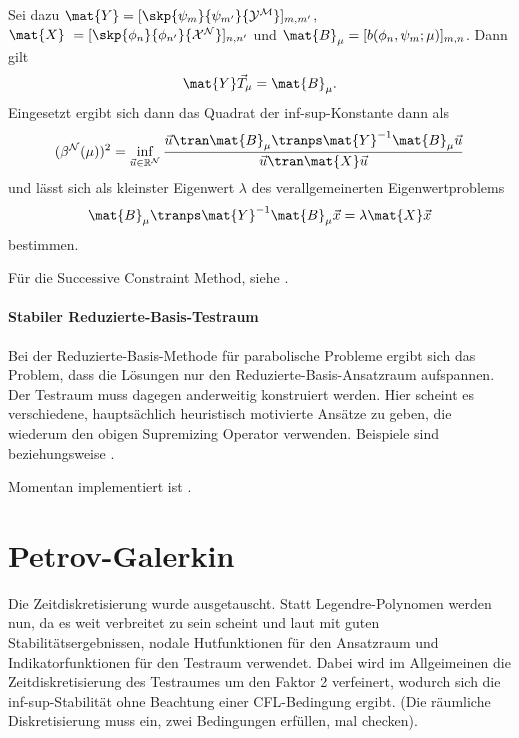Sei dazu $\mat{Y} = [\skp{\psi_{m}}{\psi_{m'}}{\mathcal Y^{\mathcal M}}]_{m, m'}$, $\mat{X} = [\skp{\phi_{n}}{\phi_{n'}}{\mathcal X^{\mathcal N}}]_{n, n'}$ und $\mat{B}_{\mu} = [b(\phi_{n}, \psi_{m}; \mu)]_{m, n}$.
Dann gilt
\begin{equation}
    \mat{Y} \vec{T}_{\mu} = \mat{B}_{\mu}.
\end{equation}
Eingesetzt ergibt sich dann das Quadrat der inf-sup-Konstante dann als
\begin{equation}
    (\beta^{\mathcal N}(\mu))^{2} = \inf_{\vec{u} \in \mathbb{R}^{\mathcal N}} \frac{\vec{u}\tran \mat{B}_{\mu}\tranps \mat{Y}^{-1} \mat{B}_{\mu} \vec{u}}{\vec{u}\tran \mat{X} \vec{u}}
\end{equation}
und lässt sich als kleinster Eigenwert $\lambda$ des verallgemeinerten Eigenwertproblems
\begin{equation}
    \mat{B}_{\mu}\tranps \mat{Y}^{-1} \mat{B}_{\mu} \vec{x} = \lambda \mat{X} \vec{x}
\end{equation}
bestimmen.

Für die Successive Constraint Method, siehe \textcite{Huynh2007}.



\paragraph{Stabiler Reduzierte-Basis-Testraum} %
\label{par:stabiler_reduzierte_basis_testraum}

Bei der Reduzierte-Basis-Methode für parabolische Probleme ergibt sich das Problem, dass die Lösungen nur den Reduzierte-Basis-Ansatzraum aufspannen. Der Testraum muss dagegen anderweitig konstruiert werden.
Hier scheint es verschiedene, hauptsächlich heuristisch motivierte Ansätze zu geben, die wiederum den obigen Supremizing Operator verwenden.
Beispiele sind \textcite[Abschnitt 4.2]{Mayerhofer:2014vx} beziehungsweise \textcite{Dahmen:2014cl}.

Momentan implementiert ist \textcite[Abschnitt 4.2]{Mayerhofer:2014vx}.


\section{Petrov-Galerkin} %
\label{sec:petrov_galerkin}

Die Zeitdiskretisierung wurde ausgetauscht. Statt Legendre-Polynomen werden nun, da es weit verbreitet zu sein scheint und laut \textcite{Andreev:2012uh,Andreev:2012ep,Andreev:2013gk} mit guten Stabilitätsergebnissen, nodale Hutfunktionen für den Ansatzraum und Indikatorfunktionen für den Testraum verwendet. Dabei wird im Allgeimeinen die Zeitdiskretisierung des Testraumes um den Faktor 2 verfeinert, wodurch sich die inf-sup-Stabilität ohne Beachtung einer CFL-Bedingung ergibt. (Die räumliche Diskretisierung muss ein, zwei Bedingungen erfüllen, mal checken).

